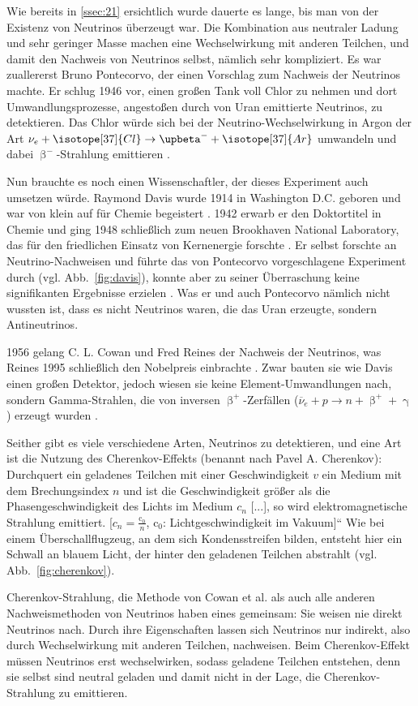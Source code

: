 \documentclass[a4paper,12pt]{article}
\newcommand{\figref}[1]{Abb.~\ref{#1}}
\begin{document}
Wie bereits in \cref{ssec:21} ersichtlich wurde dauerte es lange, bis man von der Existenz von Neutrinos überzeugt war. Die Kombination aus neutraler Ladung und sehr geringer Masse machen eine Wechselwirkung mit anderen Teilchen, und damit den Nachweis von Neutrinos selbst, nämlich sehr kompliziert. Es war zuallererst Bruno Pontecorvo, der einen Vorschlag zum Nachweis der Neutrinos machte. Er schlug 1946 vor, einen großen Tank voll Chlor zu nehmen und dort Umwandlungsprozesse, angestoßen durch von Uran emittierte Neutrinos, zu detektieren. Das Chlor würde sich bei der Neutrino-Wechselwirkung in Argon der Art $\mathrm{\nu}_e+ \isotope[37]{Cl} \rightarrow \upbeta^- + \isotope[37]{Ar}$ \cite[697]{Kolanoski2016} umwandeln und dabei $\upbeta^-$-Strahlung emittieren \cite[1--5]{Pontecorvo1946}. \par
Nun brauchte es noch einen Wissenschaftler, der dieses Experiment auch umsetzen würde. Raymond Davis wurde 1914 in Washington D.C. geboren und war von klein auf für Chemie begeistert \cite[22]{Lande2009}. 1942 erwarb er den Doktortitel in Chemie und ging 1948 schließlich zum neuen Brookhaven National Laboratory, das für den friedlichen Einsatz von Kernenergie forschte \cite{NPO}. Er selbst forschte an Neutrino-Nachweisen und führte das von Pontecorvo vorgeschlagene Experiment durch (vgl. \figref{fig:davis}), konnte aber zu seiner Überraschung keine signifikanten Ergebnisse erzielen \cite{NPO}.
Was er und auch Pontecorvo nämlich nicht wussten ist, dass es nicht Neutrinos waren, die das Uran erzeugte, sondern Antineutrinos. \par
1956 gelang C. L. Cowan und Fred Reines der Nachweis der Neutrinos, was Reines 1995 schließlich den Nobelpreis einbrachte \cite{Cowan1956, NPOb}. Zwar bauten sie wie Davis einen großen Detektor, jedoch wiesen sie keine Element-Umwandlungen nach, sondern Gamma-Strahlen, die von inversen $\upbeta^+$-Zerfällen ($\overline{\nu}_e + p \rightarrow n + \upbeta^+ + \upgamma$) erzeugt wurden \cite{Cowan1956}. \par
Seither gibt es viele verschiedene Arten, Neutrinos zu detektieren, und eine Art ist die Nutzung des Cherenkov-Effekts (benannt nach Pavel A. Cherenkov): \glqq Durchquert ein geladenes Teilchen mit einer Geschwindigkeit $v$ ein Medium mit dem Brechungsindex $n$ und ist die Geschwindigkeit größer als die Phasengeschwindigkeit des Lichts im Medium $c_n$ [...], so wird elektromagnetische Strahlung emittiert. [$c_n= \frac{\mathrm{c_0}}{n}$,  $\mathrm{c_0}$: Lichtgeschwindigkeit im Vakuum]“ \cite[437]{Kolanoski2016} Wie bei einem Überschallflugzeug, an dem sich Kondensstreifen bilden, entsteht hier ein Schwall an blauem Licht, der hinter den geladenen Teilchen abstrahlt (vgl. \figref{fig:cherenkov}). \par
Cherenkov-Strahlung, die Methode von Cowan et al. als auch alle anderen Nachweismethoden von Neutrinos haben eines gemeinsam: Sie weisen nie direkt Neutrinos nach. Durch ihre Eigenschaften lassen sich Neutrinos nur indirekt, also durch Wechselwirkung mit anderen Teilchen, nachweisen. Beim Cherenkov-Effekt müssen Neutrinos erst wechselwirken, sodass geladene Teilchen entstehen, denn sie selbst sind neutral geladen und damit nicht in der Lage, die Cherenkov-Strahlung zu emittieren.
\end{document}
